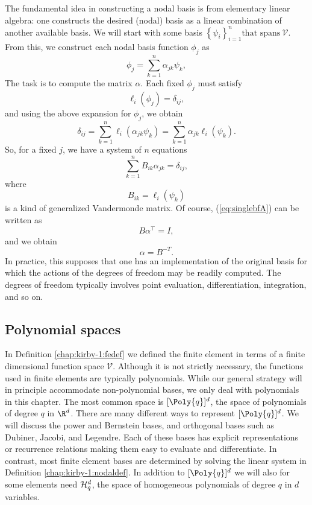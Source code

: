 The fundamental idea in constructing a nodal basis is from elementary
linear algebra: one constructs the desired (nodal) basis as a linear
combination of another available basis.  We will start with some basis
$\left\{ \psi_i \right\}_{i=1}^{n} \mbox{that spans} \ \mathcal{V}$.
From this, we construct each nodal basis function $\phi_j$ as
%
\begin{equation}
 \phi_j = \sum_{k=1}^n \alpha_{jk} \psi_k,
\end{equation}
The task is to compute the matrix $\alpha$.  Each fixed $\phi_j$ must
satisfy
\begin{equation}
\ell_i( \phi_j ) = \delta_{ij},
\end{equation}
and using the above expansion for $\phi_j$, we obtain
\begin{equation}
\delta_{ij} = \sum_{k=1}^n \ell_i( \alpha_{jk} \psi_{k} ) = \sum_{k=1}^n \alpha_{jk} \ell_i (\psi_k).
\end{equation}
So, for a fixed $j$, we have a system of $n$ equations
\begin{equation}
\label{eq:singlebfA}
\sum_{k=1}^n B_{ik} \alpha_{jk} = \delta_{ij},
\end{equation}
where
\begin{equation}
B_{ik} = \ell_i(\psi_k)
\end{equation}
is a kind of generalized Vandermonde matrix. Of course,
(\ref{eq:singlebfA}) can be written as
\begin{equation}
B \alpha^{\top} = I,
\end{equation}
and we obtain
\begin{equation}
\alpha = B^{-T}.
\end{equation}
In practice, this supposes that one has an implementation of the original
basis for which the actions of the degrees of freedom may be readily
computed.  The degrees of freedom typically involves point evaluation,
differentiation, integration, and so on.

\subsection{Polynomial spaces}

In Definition \ref{chap:kirby-1:fedef} we defined the finite element in
terms of a finite dimensional function space $\mathcal{V}$. Although it
is not strictly necessary, the functions used in finite elements are
typically polynomials.  While our general strategy will in principle
accommodate non-polynomial bases, we only deal with polynomials
in this chapter.  The most common space is $[\Poly{q}]^d$, the space of
polynomials of degree $q$ in $\R^d$. There are many different ways
to represent $[\Poly{q}]^d$. We will discuss the power and Bernstein bases,
and orthogonal bases such as Dubiner, Jacobi, and Legendre.  Each of
these bases has explicit representations or recurrence relations making
them easy to evaluate and differentiate. In contrast, most finite
element bases are determined by solving the linear system in Definition
\ref{chap:kirby-1:nodaldef}.  In addition to $[\Poly{q}]^d$ we will also for
some elements need ${\mathcal{H}}^d_q$, the space of homogeneous polynomials of
degree $q$ in $d$ variables.

